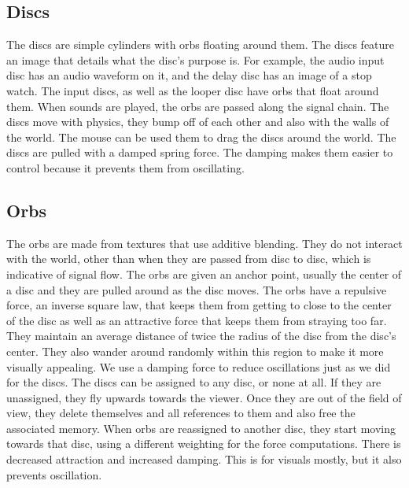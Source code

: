 \documentclass[pdftext,twoside,10pt]{article}
\begin{document}
\subsection{Discs}
The discs are simple cylinders with orbs floating around them. The discs feature an image that details what the disc's purpose is. For example, the audio input disc has an audio waveform on it, and the delay disc has an image of a stop watch. The input discs, as well as the looper disc have orbs that float around them. When sounds are played, the orbs are passed along the signal chain. The discs move with physics, they bump off of each other and also with the walls of the world. The mouse can be used them to drag the discs around the world. The discs are pulled with a damped spring force. The damping makes them easier to control because it prevents them from oscillating.

\subsection{Orbs}
The orbs are made from textures that use additive blending. They do not interact with the world, other than when they are passed from disc to disc, which is indicative of signal flow. The orbs are given an anchor point, usually the center of a disc and they are pulled around as the disc moves. The orbs have a repulsive force, an inverse square law, that keeps them from getting to close to the center of the disc as well as an attractive force that keeps them from straying too far. They maintain an average distance of twice the radius of the disc from the disc's center. They also wander around randomly within this region to make it more visually appealing. We use a damping force to reduce oscillations just as we did for the discs. The discs can be assigned to any disc, or none at all. If they are unassigned, they fly upwards towards the viewer. Once they are out of the field of view, they delete themselves and all references to them and also free the associated memory. When orbs are reassigned to another disc, they start moving towards that disc, using a different weighting for the force computations. There is decreased attraction and increased damping. This is for visuals mostly, but it also prevents oscillation.

\vspace{1cm}
\end{document}
